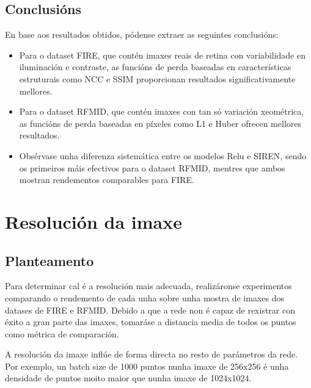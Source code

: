 \subsection{Conclusións}
\label{subsec:Conclusions-loss}

En base aos resultados obtidos, pódense extraer as seguintes conclusións:
\begin{itemize}
    \item Para o dataset FIRE, que contén imaxes reais de retina con variabilidade en iluminación e contraste, as funcións de perda baseadas en características estruturais como NCC e SSIM proporcionan resultados significativamente mellores.
    \item Para o dataset RFMID, que contén imaxes con tan só variación xeométrica, as funcións de perda baseadas en píxeles como L1 e Huber ofrecen mellores resultados.
    \item Obsérvase unha diferenza sistemática entre os modelos Relu e SIREN, sendo os primeiros máis efectivos para o dataset RFMID, mentres que ambos mostran rendementos comparables para FIRE.
\end{itemize}


\section{Resolución da imaxe}
\label{sec:Resolución da imaxe}

\subsection{Planteamento}
\label{subsec:Planteamento-resolution}

Para determinar cal é a resolución mais adecuada, realizáronse experimentos comparando o rendemento de cada unha sobre unha mostra de imaxes dos datases de FIRE e RFMID.
Debido a que a rede non é capaz de rexistrar con éxito a gran parte das imaxes, tomaráse a distancia media de todos os puntos como métrica de comparación.

A resolución da imaxe inflúe de forma directa no resto de parámetros da rede.
Por exemplo, un batch size de 1000 puntos nunha imaxe de 256x256 é unha densidade de puntos moito maior que nunha imaxe de 1024x1024.

